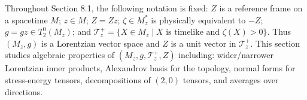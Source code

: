 Throughout Section 8.1, the following notation is fixed: $Z$ is a reference frame on a spacetime $M$; $z \in M$; $Z = Zz$; $\zeta \in M_z^*$ is physically equivalent to $-Z$; $g = gz \in T_2^0(M_z)$; and $\mathcal{T}_z^+ = \{X \in M_z \mid X \text{ is timelike and } \zeta(X) > 0\}$. Thus $(M_z, g)$ is a Lorentzian vector space and $Z$ is a unit vector in $\mathcal{T}_z^+$. This section studies algebraic properties of $(M_z, g, \mathcal{T}_z^+, Z)$ including: wider/narrower Lorentzian inner products, Alexandrov basis for the topology, normal forms for stress-energy tensors, decompositions of $(2,0)$ tensors, and averages over directions.
